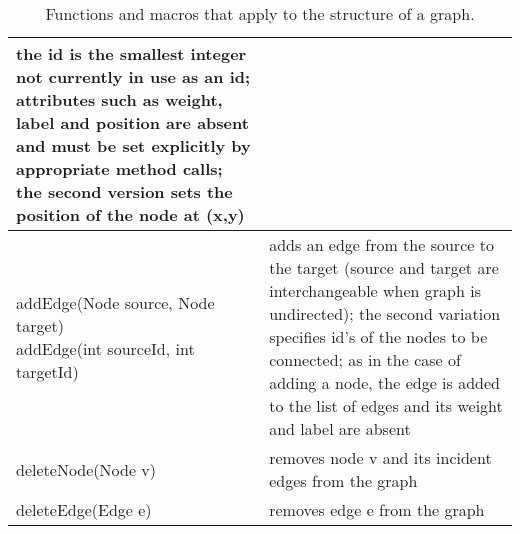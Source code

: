 \begin{table}
\begin{tabular}{| m{} | m{} |}
    the id is the smallest integer not currently in use as an id;
    attributes such as weight, label and position are absent and must be set explicitly
    by appropriate method calls;
    the second version sets the position of the node at \textsf{(x,y)}
    \\ \hline
    \shortstack[l]{
      \textsf{addEdge(Node source, Node target)}\\
      \textsf{addEdge(int sourceId, int targetId)}
    }
    &
    adds an edge from the source to
    the target (source and target are interchangeable when graph is undirected);
    the second variation specifies id's of the nodes to be connected;
    as in the case of adding a node, the edge is added to the list of edges and
    its weight and label are absent
    \\ \hline
    \textsf{deleteNode(Node v)}
    &
    removes node \textsf{v} and its incident edges from the graph
    \\ \hline
    \textsf{deleteEdge(Edge e)}
    &
    removes edge \textsf{e} from the graph
    \\ \hline
  \end{tabular}
  \caption{Functions and macros that apply to the structure of a graph.}
  \label{tab:graph_functions}
\end{table}
